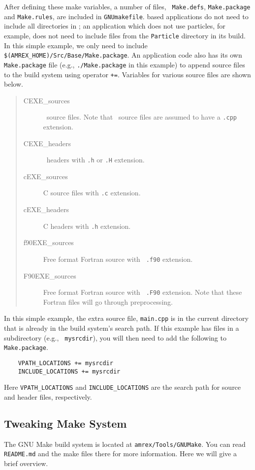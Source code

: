 After defining these make variables, a number of files, {\tt
  Make.defs}, {\tt Make.package} and {\tt Make.rules}, are included in
{\tt GNUmakefile}.  \amrex\-based applications do not need to include
all directories in \amrex; an application which does not use particles,
for example, does not need to include files from the {\tt Particle}
directory in its build.
In this simple example, we only need to include {\tt
  \$(AMREX\_HOME)/Src/Base/Make.package}.  An application code also
has its own {\tt Make.package} file (e.g., {\tt ./Make.package} in
this example) to append source files to the build system using
operator {\tt +=}.  Variables for various source files are shown
below.
\begin{quote}
\begin{description}
\item [{CEXE\_sources}] \cpp\ source files.  Note that \cpp\
  source files are assumed to have a {\tt .cpp} extension.
\item [{CEXE\_headers}] \cpp\ headers with {\tt .h} or {\tt .H} extension.
\item [{cEXE\_sources}] C source files with {\tt .c} extension.
\item [{cEXE\_headers}] C headers with {\tt .h} extension.
\item [{f90EXE\_sources}] Free format Fortran source with {\tt
    .f90} extension.
\item [{F90EXE\_sources}] Free format Fortran source with {\tt
    .F90} extension.  Note that these Fortran files will go through
  preprocessing.
\end{description}
\end{quote}
In this simple example, the extra source file, {\tt main.cpp} is in
the current directory that is already in the build system's search
path.  If this example has files in a subdirectory (e.g., {\tt
  mysrcdir}), you will then need to add the following to {\tt
  Make.package}. 
\begin{verbatim}
    VPATH_LOCATIONS += mysrcdir
    INCLUDE_LOCATIONS += mysrcdir
\end{verbatim}
Here {\tt VPATH\_LOCATIONS} and {\tt INCLUDE\_LOCATIONS} are the search
path for source and header files, respectively.

\subsection{Tweaking Make System}

The GNU Make build system is located at {\tt amrex/Tools/GNUMake}.
You can read {\tt README.md} and the make files there for more
information.  Here we will give a brief overview.

